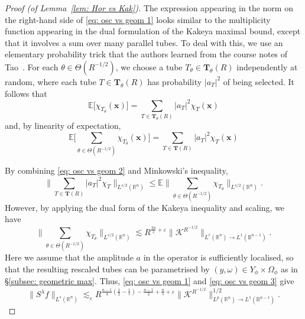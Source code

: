 \documentclass[reqno]{amsart}
\numberwithin{equation}{section}
\newcommand{\B}{\mathbb{B}}
\newcommand{\E}{\mathbb{E}}
\newcommand{\R}{\mathbb{R}}
\newcommand{\cK}{\mathcal{K}}
\newcommand{\bx}{\mathbf{x}}
\newcommand{\bT}{\mathbf{T}}
\theoremstyle{plain}
\theoremstyle{definition}
\begin{document}
\begin{proof}[Proof (of Lemma~\ref{lem: Hor vs Kak})]
The expression appearing in the norm on the right-hand side of \eqref{eq: osc vs geom 1} looks similar to the multiplicity function appearing in the dual formulation of the Kakeya maximal bound, except that it involves a sum over many parallel tubes. To deal with this, we use an elementary probability trick that the authors learned from the course notes of Tao~\cite{Tao_notes}. For each $\theta \in \Theta(R^{-1/2})$, we choose a tube $T_{\theta} \in \bT_{\theta}(R)$ independently at random, where each tube $T \in \bT_{\theta}(R)$ has probability $|a_T|^2$ of being selected. It follows that
\begin{equation*}
    \E\big[\chi_{T_{\theta}}(\bx)\big] = \sum_{T \in \bT_{\theta}(R)} |a_T|^2 \chi_T(\bx)
\end{equation*}
and, by linearity of expectation,
\begin{equation}\label{eq: osc vs geom 2}
    \E\Big[\sum_{\theta \in \Theta(R^{-1/2})} \chi_{T_{\theta}}(\bx)\Big] = \sum_{T \in \bT(R)} |a_T|^2 \chi_T(\bx)
\end{equation}

By combining \eqref{eq: osc vs geom 2} and Minkowski's inequality,
\begin{equation*}
    \Big\|\sum_{T \in \bT(R)} |a_T|^2\chi_T \Big\|_{L^{s/2}(\R^n)} \leq \E \Big\|\sum_{\theta \in \Theta(R^{-1/2})} \chi_{T_{\theta}} \Big\|_{L^{s/2}(\R^n)}.
\end{equation*}
However, by applying the dual form of the Kakeya inequality and scaling, we have 
\begin{equation}\label{eq: osc vs geom 3}
    \Big\|\sum_{\theta \in \Theta(R^{-1/2})} \chi_{T_{\theta}} \Big\|_{L^{s/2}(\R^n)} \lesssim R^{\frac{2n}{s} + \varepsilon}\|\cK^{R^{-1/2}}\|_{L^r(\R^n) \to L^1(\B^{n-1})}.
\end{equation}
Here we assume that the amplitude $a$ in the operator is sufficiently localised, so that the resulting rescaled tubes can be parametrised by $(y, \omega) \in Y_{\phi} \times \Omega_{\phi}$ as in \S\ref{subsec: geometric max}. Thus, \eqref{eq: osc vs geom 1} and \eqref{eq: osc vs geom 3} give
\begin{equation}\label{eq: osc vs geom 4}
    \|S^{\lambda}f\|_{L^s(\R^n)} \lesssim_{\varepsilon} R^{\frac{n-1}{4}(\frac{1}{2} - \frac{1}{s}) - \frac{n-1}{2} + \frac{n}{s} + \varepsilon} \|\cK^{R^{-1/2}}\|_{L^p(\R^n) \to L^1(\B^{n-1})}^{1/2}.
\end{equation}


\end{proof}
\end{document}
